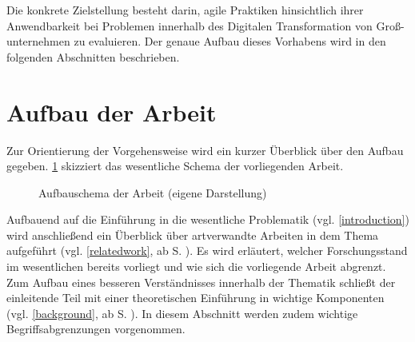 Die konkrete Zielstellung besteht darin, agile Praktiken hinsichtlich ihrer Anwendbarkeit bei Problemen innerhalb des Digitalen Transformation von Groß-unternehmen zu evaluieren. Der genaue Aufbau dieses Vorhabens wird in den folgenden Abschnitten beschrieben.

\section{Aufbau der Arbeit}
\label{introduction:schema}

Zur Orientierung der Vorgehensweise wird ein kurzer Überblick über den Aufbau gegeben.  \ref{fig:aufbau} skizziert das wesentliche Schema der vorliegenden Arbeit.

\begin{figure}
	\centering
	\caption[Aufbauschema der Arbeit]{Aufbauschema der Arbeit (eigene Darstellung)}
	\label{fig:aufbau}
\end{figure}

Aufbauend auf die Einführung in die wesentliche Problematik  (vgl. \ref{introduction}) wird anschließend ein Überblick über artverwandte Arbeiten in dem Thema aufgeführt (vgl. \ref{relatedwork}, ab S. \pageref{relatedwork}). Es wird erläutert, welcher Forschungsstand im wesentlichen bereits vorliegt und wie sich die vorliegende Arbeit abgrenzt. Zum Aufbau eines besseren Verständnisses innerhalb der Thematik schließt der einleitende Teil mit einer theoretischen Einführung in wichtige Komponenten (vgl. \ref{background}, ab S. \pageref{background}). In diesem Abschnitt werden zudem wichtige Begriffsabgrenzungen vorgenommen.

